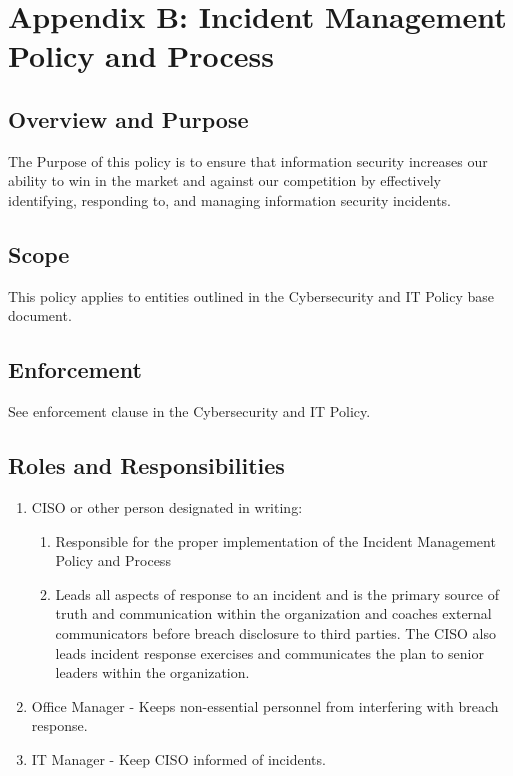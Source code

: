 \documentclass[../main.tex]{subfiles}
\begin{document}
\section{Appendix B: Incident Management Policy and Process}
\subsection{Overview and Purpose}
The Purpose of this policy is to ensure that information security increases our ability to win in the market and against our competition by effectively identifying, responding to,
and managing information security incidents.
\subsection{Scope}
This policy applies to entities outlined in the Cybersecurity and IT Policy base document.
\subsection{Enforcement}
See enforcement clause in the Cybersecurity and IT Policy.
\subsection{Roles and Responsibilities}
\begin{enumerate}
    \item CISO or other person designated in writing:
    \begin{enumerate}
        \item Responsible for the proper implementation of the Incident Management Policy and Process
        \item Leads all aspects of response to an incident and is the primary source of truth and communication within the organization and coaches external communicators before breach
        disclosure to third parties. The CISO also leads incident response exercises and communicates the plan to senior leaders within the organization.
    \end{enumerate}
    \item Office Manager - Keeps non-essential personnel from interfering with breach response.
    \item IT Manager - Keep CISO informed of incidents.
\end{enumerate}
\end{document}
